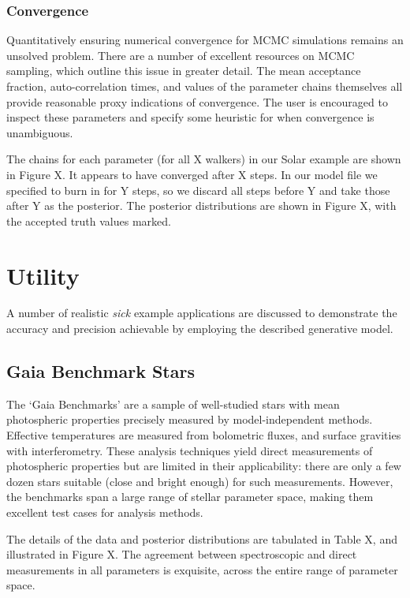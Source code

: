 \documentclass{aastex}
\newcommand{\sick}{\textit{sick}}
\begin{document}
\subsubsection{Convergence}
Quantitatively ensuring numerical convergence for MCMC simulations remains an unsolved problem. There are a number of excellent resources on MCMC sampling, which outline this issue in greater detail. The mean acceptance fraction, auto-correlation times, and values of the parameter chains themselves all provide reasonable proxy indications of convergence. The user is encouraged to inspect these parameters and specify some heuristic for when convergence is unambiguous.

The chains for each parameter (for all X walkers) in our Solar example are shown in Figure X. It appears to have converged after X steps. In our model file we specified to burn in for Y steps, so we discard all steps before Y and take those after Y as the posterior. The posterior distributions are shown in Figure X, with the accepted truth values marked.



\section{Utility}
A number of realistic \sick{} example applications are discussed to demonstrate the accuracy and precision achievable by employing the described generative model.

\subsection{Gaia Benchmark Stars}
The `Gaia Benchmarks' are a sample of well-studied stars with mean photospheric properties precisely measured by model-independent methods. Effective temperatures are measured from bolometric fluxes, and surface gravities with interferometry. These analysis techniques yield direct measurements of photospheric properties but are limited in their applicability: there are only a few dozen stars suitable (close and bright enough) for such measurements. However, the benchmarks span a large range of stellar parameter space, making them excellent test cases for analysis methods.



The details of the data and posterior distributions are tabulated in Table X, and illustrated in Figure X. The agreement between spectroscopic and direct measurements in all parameters is exquisite, across the entire range of parameter space.  
\end{document}
